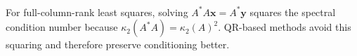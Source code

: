 \begin{perspective} \label{per:normal-equations-squaring-condition-number} \\
For full-column-rank least squares, solving $A^*A\mathbf{x}=A^*\mathbf{y}$ squares the spectral condition number because $\kappa_2(A^*A)=\kappa_2(A)^2$. QR-based methods avoid this squaring and therefore preserve conditioning better.
\end{perspective}
